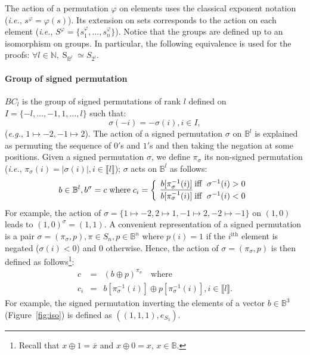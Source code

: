 \documentclass[12pt]{elsarticle}
\newcommand{\Nset}[0]{\mathbb{N}}
\newcommand{\Bset}[0]{\mathbb{B}}
\newcommand{\abbrev}[1]{#1, \relax}
\newcommand{\ie}[0]{\abbrev{\textit{i.e.}}}
\newcommand{\eg}[0]{\abbrev{\textit{e.g.}}}
\newcommand{\gsym}[1]{\operatorname{S}_{#1}}
\renewcommand{\lnot}[1]{\overline{#1}}
\newcommand{\lxor}[0]{\oplus}
\begin{document}
The action of a permutation $\varphi$ on elements uses the classical exponent notation (\ie $s^\varphi = \varphi(s)$). Its extension on sets corresponds to the action on each element (\ie $ S^\varphi = \{s_1^\varphi, \ldots, s_n^\varphi \}$).
Notice  that the groups are defined up to an isomorphism on groups. In particular, the following equivalence is used for the proofs: $\forall l \in \Nset, \gsym{\Bset^l} \simeq S_{2^l}$.

\paragraph{Group of signed permutation}  $BC_l$ is the group of signed permutations of rank $l$ defined on $I=\{-l,\ldots,-1,1,\ldots,l\}$ such that: 
$$\sigma({-i}) = - \sigma({i}), i \in I,$$ 
(\eg $1 \mapsto -2, -1 \mapsto 2$). The action of a signed permutation $\sigma$ on $\Bset^l$ is explained as permuting the sequence of $0'$s and $1'$s and then taking the negation at some positions. Given a signed permutation $\sigma$,
we define $\pi_\sigma$ its non-signed permutation (\ie $\pi_\sigma(i)=|\sigma(i)|, i \in \llbracket l \rrbracket$); $\sigma$ acts on $\Bset^l$ as follows: 
\begin{equation*}
b \in \Bset^l, b^{\sigma} = c \;\text{where}\; c_i = \left \{ 
\begin{array}{l @{\; \text{iff }\;} l}
b[{\pi_\sigma^{-1}(i)}] & \sigma^{-1}(i) > 0 \\
\lnot{b[{\pi_\sigma^{-1}(i)}]} & \sigma^{-1}(i) < 0
\end{array}
\right.
\end{equation*}
For example, the action of $\sigma = \{ 1 \mapsto -2, 2 \mapsto 1, -1 \mapsto 2 , -2 \mapsto -1 \}$ on $(1,0)$ leads to $(1,0)^{\sigma} = (1,1)$. 
A convenient representation of a signed permutation is a pair $\sigma= (\pi_\sigma,p), \pi \in S_{n}, p \in \Bset^n$ where 
$p(i)=1$ if the $i^\text{ith}$ element is negated ($\sigma(i)<0$) and $0$ otherwise. Hence, the action of $\sigma=(\pi_\sigma,p)$ is then defined as follows\footnote{Recall that $x \lxor 1 = \lnot x$ and $x \lxor 0 = x$, $x \in \Bset$.}: 
\begin{eqnarray*}
 c &=& (b \lxor p)^{\pi_\sigma} \quad \text{where} \\
 c_i &=& b[{\pi_\sigma^{-1}(i)}] \lxor p[\pi_\sigma^{-1}(i)], i \in \llbracket l \rrbracket. 
\end{eqnarray*}
 For example, the signed permutation inverting the elements of a vector $b\in \Bset^3$ (Figure~\ref{fig:iso}) is defined as $((1,1,1),e_{S_3})$. 
\end{document}
